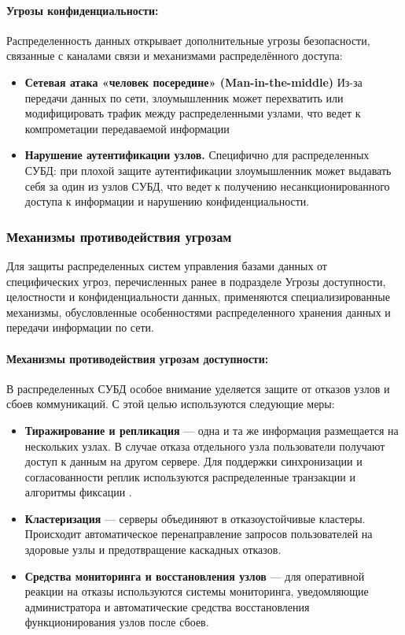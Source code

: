 \paragraph{Угрозы конфиденциальности:}

Распределенность данных открывает дополнительные угрозы безопасности, связанные с каналами связи и механизмами распределённого доступа:

\begin{itemize} 
    \item \textbf{Сетевая атака «человек посередине» (Man-in-the-middle)} Из-за передачи данных по сети, злоумышленник может перехватить или модифицировать трафик между распределенными узлами, что ведет к компрометации передаваемой информации  
    \item \textbf{Нарушение аутентификации узлов.} Специфично для распределенных СУБД: при плохой защите аутентификации злоумышленник может выдавать себя за один из узлов СУБД, что ведет к получению несанкционированного доступа к информации и нарушению конфиденциальности. 
\end{itemize}

\subsubsection{Механизмы противодействия угрозам}

Для защиты распределенных систем управления базами данных от специфических угроз, перечисленных ранее в подразделе Угрозы доступности, целостности и конфиденциальности данных, применяются специализированные механизмы, обусловленные особенностями распределенного хранения данных и передачи информации по сети.

\paragraph{Механизмы противодействия угрозам доступности:}

В распределенных СУБД особое внимание уделяется защите от отказов узлов и сбоев коммуникаций. С этой целью используются следующие меры:

\begin{itemize} 
    \item \textbf{Тиражирование и репликация} — одна и та же информация размещается на нескольких узлах. В случае отказа отдельного узла пользователи получают доступ к данным на другом сервере. Для поддержки синхронизации и согласованности реплик используются распределенные транзакции и алгоритмы фиксации \autocite{Tanenbaum}.
    \item \textbf{Кластеризация} — серверы объединяют в отказоустойчивые кластеры. Происходит автоматическое перенаправление запросов пользователей на здоровые узлы и предотвращение каскадных отказов.
    \item \textbf{Средства мониторинга и восстановления узлов} — для оперативной реакции на отказы используются системы мониторинга, уведомляющие администратора и автоматические средства восстановления функционирования узлов после сбоев.
\end{itemize}

